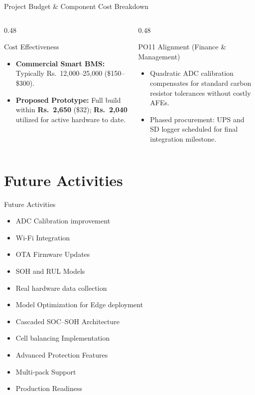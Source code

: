 \documentclass[10pt,aspectratio=43]{beamer}
\begin{document}
\begin{frame}[t]{Project Budget \& Component Cost Breakdown}
  \begin{columns}[T,onlytextwidth]
    \begin{column}{0.48\textwidth}
      \begin{block}{Cost Effectiveness}
        \fontsize{6pt}{7.2pt}\selectfont
        \begin{itemize}
          \setlength{\itemsep}{1pt}
          \item \textbf{Commercial Smart BMS:} Typically Rs.~12,000--25,000 (\$150--\$300).
          \item \textbf{Proposed Prototype:} Full build within \textbf{Rs.~2,650} (\$32); \textbf{Rs.~2,040} utilized for active hardware to date.
        \end{itemize}
      \end{block}
    \end{column}
    \begin{column}{0.48\textwidth}
      \begin{block}{PO11 Alignment (Finance \& Management)}
        \fontsize{6pt}{7.2pt}\selectfont
        \begin{itemize}
          \setlength{\itemsep}{1pt}
          \item Quadratic ADC calibration compensates for standard carbon resistor tolerances without costly AFEs.
          \item Phased procurement: UPS and SD logger scheduled for final integration milestone.
        \end{itemize}
      \end{block}
    \end{column}
  \end{columns}
\end{frame}

\section{Future Activities}
\begin{frame}{Future Activities}
  \small
  \begin{itemize}
    \item ADC Calibration improvement
    \item Wi-Fi Integration
    \item OTA Firmware Updates 
    \item SOH and RUL Models
    \item Real hardware data collection
    \item Model Optimization for Edge deployment
    \item Cascaded SOC--SOH Architecture
    \item Cell balancing Implementation
    \item Advanced Protection Features
    \item Multi-pack Support
    \item {Production Readiness}
  \end{itemize}
\end{frame}
\end{document}
